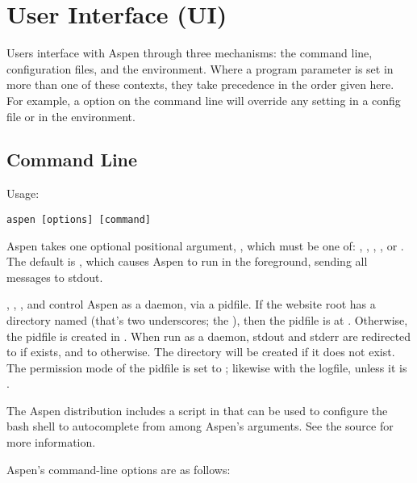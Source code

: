 \chapter{User Interface (UI) \label{interface}}

Users interface with Aspen through three mechanisms: the command line,
configuration files, and the environment. Where a program parameter is set in
more than one of these contexts, they take precedence in the order given here.
For example, a  option on the command line will override any
 setting in a config file or in the environment.


\section{Command Line \label{command-line}}

Usage:

\begin{verbatim}
aspen [options] [command]
\end{verbatim}

Aspen takes one optional positional argument, , which must be one
of: , , , , or .
The default is , which causes Aspen to run in the foreground,
sending all messages to stdout.

, , , and  control Aspen as a
daemon, via a pidfile. If the website root has a directory named \file{__}
(that's two underscores; the ), then the pidfile is at
. Otherwise, the pidfile is created in . When
run as a daemon, stdout and stderr are redirected to  if
\file{__} exists, and to  otherwise. The  directory
will be created if it does not exist. The permission mode of the pidfile is set
to ; likewise with the logfile, unless it is .

The Aspen distribution includes a script in 
that can be used to configure the bash shell to autocomplete from among Aspen's
arguments. See the source for more information.

Aspen's command-line options are as follows:

